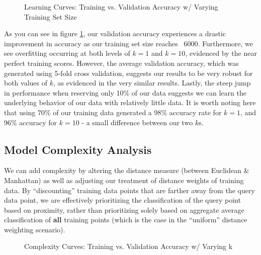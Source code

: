 \documentclass[letterpaper,12pt]{article}
\begin{document}
\begin{figure} %
  \centering
  \hspace{8pt}%
  \caption{Learning Curves:  Training vs. Validation Accuracy w/ Varying Training Set Size}\label{fig:kNN Learning Curves}
\end{figure}

As you can see in figure \ref{fig:kNN Learning Curves}, our validation accuracy experiences a drastic improvement in accuracy as our training set size reaches ~6000.  Furthermore, we see overfitting occurring at both levels of $k=1$ and $k=10$, evidenced by the near perfect training scores.  However, the average validation accuracy, which was generated using 5-fold cross validation, suggests our results to be very robust for both values of $k$, as evidenced in the very similar results.  Lastly, the steep jump in performance when reserving only 10\% of our data suggests we can learn the underlying behavior of our data with relatively little data.  It is worth noting here that using 70\% of our training data generated a 98\% accuracy rate for $k=1$, and 96\% accuracy for $k=10$ - a small difference between our two $k$s.

\subsection{Model Complexity Analysis}
We can add complexity by altering the distance measure (between Euclidean \& Manhattan) as well as adjusting our treatment of distance weights of training data.  By ``discounting'' training data points that are farther away from the query data point, we are effectively prioritizing the classification of the query point based on proximity, rather than prioritizing solely based on aggregate average classification of \textbf{all} training points (which is the case in the ``uniform'' distance weighting scenario).  

\begin{figure} %
  \centering
  \hspace{8pt}%
  \caption{Complexity Curves:  Training vs. Validation Accuracy w/ Varying k }\label{fig:kNN Complexity Curves}

 
\end{figure}
\end{document}
